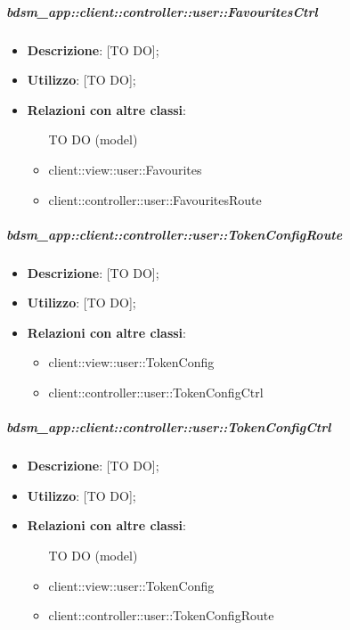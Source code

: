 		\subparagraph{bdsm\_app::client::controller::user::FavouritesCtrl} %
		\label{subp:client_controller_user_favouritesctrl}
			\begin{itemize}
				\item \textbf{Descrizione}: [TO DO];
				\item \textbf{Utilizzo}: [TO DO];
				\item \textbf{Relazioni con altre classi}:
					\begin{itemize}
						\item [TO DO] (model)
						\item client::view::user::Favourites
						\item client::controller::user::FavouritesRoute
					\end{itemize}
			\end{itemize}

		\subparagraph{bdsm\_app::client::controller::user::TokenConfigRoute} %
		\label{subp:bdsm_app_client_controller_user_tokenconfigroute}
			\begin{itemize}
				\item \textbf{Descrizione}: [TO DO];
				\item \textbf{Utilizzo}: [TO DO];
				\item \textbf{Relazioni con altre classi}:
					\begin{itemize}
						\item client::view::user::TokenConfig
						\item client::controller::user::TokenConfigCtrl
					\end{itemize}
			\end{itemize}

		\subparagraph{bdsm\_app::client::controller::user::TokenConfigCtrl} %
		\label{subp:client_controller_user_tokenconfigctrl}
			\begin{itemize}
				\item \textbf{Descrizione}: [TO DO];
				\item \textbf{Utilizzo}: [TO DO];
				\item \textbf{Relazioni con altre classi}:
					\begin{itemize}
						\item [TO DO] (model)
						\item client::view::user::TokenConfig
						\item client::controller::user::TokenConfigRoute
					\end{itemize}
			\end{itemize}

